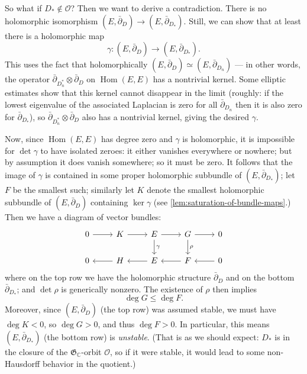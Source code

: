 \documentclass[12pt,letterpaper,reqno]{article}
\numberwithin{equation}{section}
\newcommand{\fG}{{\mathfrak G}}
\newcommand{\cO}{\ensuremath{\mathcal O}}
\newcommand{\C}{\ensuremath{\mathbb C}}
\newcommand{\ti}[1]{\textit{#1}}
\DeclareMathOperator{\Hom}{Hom}
\begin{document}
\begin{pf}
So what if $D_* \not\in \cO$? Then we want to derive
a contradiction. There
is no holomorphic isomorphism $(E,\bar\partial_D) \to (E,\bar\partial_{D_*})$.
Still, we can show that at least there is a
holomorphic map
\begin{equation}
  \gamma: (E,\bar\partial_D) \to (E,\bar\partial_{D_*}).
\end{equation}
This uses the fact that holomorphically $(E,\bar\partial_D) \simeq (E,\bar\partial_{D_n})$ --- in other words, the operator
$\bar\partial_{D^*_n} \otimes \bar\partial_D$
on $\Hom(E,E)$ has a nontrivial kernel. Some elliptic estimates
show that this kernel cannot disappear in the limit (roughly:
if the lowest eigenvalue of the associated Laplacian is zero
for all $\bar\partial_{D_n}$ then it is also zero for $\bar\partial_{D_*}$),
so $\bar\partial_{D^*_n} \otimes \bar\partial_D$
 also has a nontrivial kernel,
giving the desired $\gamma$.

Now, since $\Hom(E,E)$ has degree zero and $\gamma$ is holomorphic,
it is impossible for $\det \gamma$ to have isolated zeroes: it either
vanishes everywhere or nowhere; but by assumption it does vanish somewhere;
so it must be zero. It follows that the image of $\gamma$ is contained in
some proper holomorphic subbundle of $(E,\bar\partial_{D_*})$; let $F$
be the smallest such;
similarly let $K$ denote the smallest holomorphic subbundle
of $(E,\bar\partial_D)$ containing $\ker \gamma$ (see \autoref{lem:saturation-of-bundle-maps}.)
Then we have a diagram of vector bundles:
\begin{equation}
\begin{tikzcd}
0 \arrow[r] & K \arrow[r] & E \arrow[r] \arrow[d,"\gamma"] & G \arrow[d,"\rho"] \arrow[r] & 0 \\
0 & H \arrow[l] & E \arrow[l] & F \arrow[l] & 0 \arrow[l]
\end{tikzcd}
\end{equation}
where on the top row we have the holomorphic structure
$\bar\partial_D$ and on the bottom $\bar\partial_{D_*}$;
and $\det \rho$ is generically nonzero.
The existence of $\rho$ then implies
\begin{equation}
  \deg G \le \deg F.
\end{equation}
Moreover, since $(E,\bar\partial_D)$ (the top row) was assumed stable,
we must have $\deg K < 0$, so $\deg G > 0$, and thus $\deg F > 0$.
In particular, this means $(E,\bar\partial_{D_*})$ (the bottom row) is
\ti{unstable}. (That is as we should expect: $D_*$ is
in the closure of the $\fG_\C$-orbit $\cO$, so if it
were stable, it would lead to some non-Hausdorff behavior
in the quotient.)


\end{pf}
\end{document}
